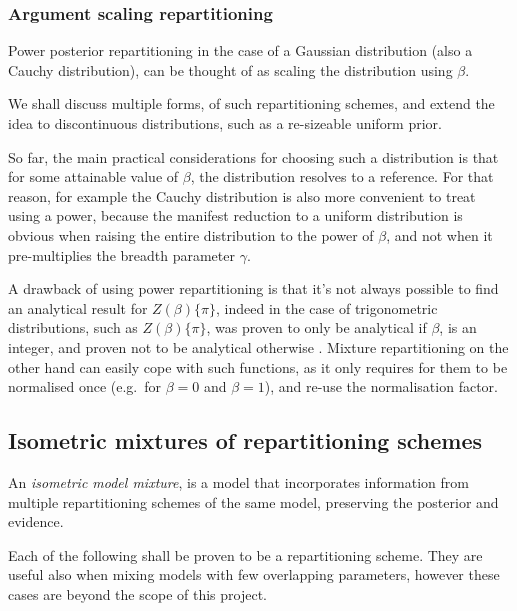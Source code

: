 \documentclass[usenatbib]{mnras}
\begin{document}
\subsubsection{Argument scaling repartitioning}\label{sec:orgfe92f25}

Power posterior repartitioning in the case of a Gaussian
distribution (also a Cauchy distribution), can be thought of as
scaling the distribution using \(\beta\).

We shall discuss multiple forms, of such repartitioning schemes,
and extend the idea to discontinuous distributions, such as a
re-sizeable uniform prior.  

So far, the main practical considerations for choosing such a
distribution is that for some attainable value of \(\beta\), the
distribution resolves to a reference. For that reason, for example
the Cauchy distribution is also more convenient to treat using a
power, because the manifest reduction to a uniform distribution is
obvious when raising the entire distribution to the power of
\(\beta\), and not when it pre-multiplies the breadth parameter
\(\gamma\).

A drawback of using power repartitioning is that it's not always
possible to find an analytical result for \(Z(\beta)\{\pi\}\), indeed
in the case of trigonometric distributions, such as \(Z(\beta)\{\pi\}\),
was proven to only be analytical if \(\beta\), is an integer, and
proven not to be analytical otherwise \citep{Liouville1837}. Mixture
repartitioning on the other hand can easily cope with such
functions, as it only requires for them to be normalised once
(e.g.~for \(\beta=0\) and \(\beta=1\)), and re-use the normalisation
factor.

\subsection{Isometric mixtures of repartitioning schemes}
An \emph{isometric model mixture}, is a model that incorporates
information from multiple repartitioning schemes of the same model,
preserving the posterior and evidence.

Each of the following shall be proven to be a repartitioning
scheme. They are useful also when mixing models with few overlapping
parameters, however these cases are beyond the scope of this project.
\end{document}
